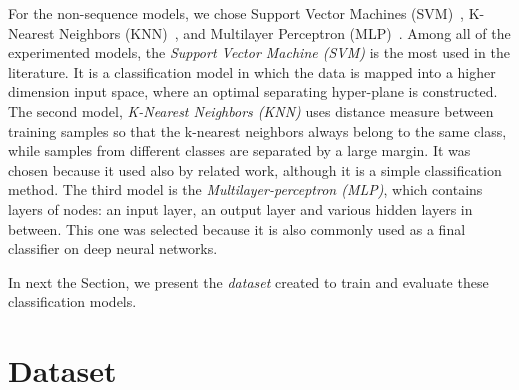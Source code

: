 For the non-sequence models, we chose Support Vector Machines (SVM)~\cite{cortes1995support}, K-Nearest Neighbors (KNN)~\cite{peterson2009k}, and Multilayer Perceptron (MLP)~\cite{haykin2009neural}.
Among all of the experimented models, the \textit{Support Vector Machine (SVM)} is the most used in the literature.
It is a classification model in which the data is mapped into a higher dimension input space, where an optimal separating hyper-plane is constructed.
The second model, \textit{K-Nearest Neighbors (KNN)} uses distance measure between training samples so that the k-nearest neighbors always belong to the same class, while samples from different classes are separated by a large margin. 
It was chosen because it used also by related work, although it is a simple classification method.
The third model is the \textit{Multilayer-perceptron (MLP)}, which contains layers of nodes: an input layer, an output layer and various hidden layers in between. 
This one was selected because it is also commonly used as a final classifier on deep neural networks.  

In next the Section, we present the \textit{dataset} created to train and evaluate these classification models.

\section{Dataset}\label{sec:dataset}


